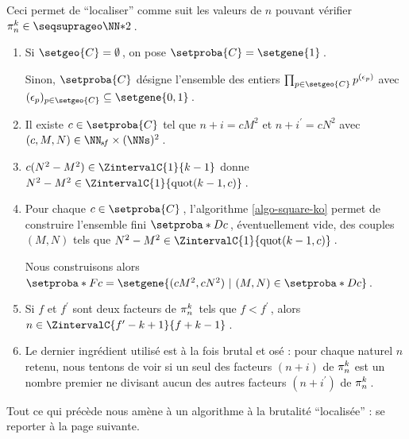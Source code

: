 Ceci permet de \enquote{localiser} comme suit les valeurs de $n$ pouvant vérifier $\consprod \in \NNssquare$\,.
%
\begin{enumerate}
	\item Si $\setgeo{C} = \emptyset$\,, on pose $\setproba{C} = \setgene{1}$\,. 
	
	\noindent
	Sinon, $\setproba{C}$ désigne l'ensemble des entiers $\prod_{p \in \setgeo{C}} p^{(\epsilon_p)}$ avec $(\epsilon_p)_{p \in \setgeo{C}} \subseteq \setgene{0, 1}$\,.


	\item Il existe $c \in \setproba{C}$ tel que $n+i = c M^2$ et $n+i^\prime = c N^2$ avec $(c, M, N) \in \NNsf \times ( \NNs )^2$\,.
	


	\item $c ( N^2 - M^2 ) \in \ZintervalC{1}{k-1}$ donne $N^2 - M^2 \in \ZintervalC{1}{\quot{k-1}{c}}$\,.


	\item Pour chaque $c \in \setproba{C}$\,, l'algorithme \ref{algo-square-ko} permet de construire l'ensemble fini $\setproba*{D}{c}$\,, éventuellement vide, des couples $(M, N)$ tels que $N^2 - M^2 \in \ZintervalC{1}{\quot{k-1}{c}}$\,.
	
	\noindent
	Nous construisons alors
	$\setproba*{F}{c} = \setgene{ (c M^2, c N^2) \,\, | \,\, (M, N) \in \setproba*{D}{c} }$\,.
	


	\item Si $f$ et $f^\prime$ sont deux facteurs de $\consprod$\, tels que $f < f^\prime$\,, alors $n \in \ZintervalC{f^\prime - k + 1}{f + k - 1}$\,.
	


	\item Le dernier ingrédient utilisé est à la fois brutal et osé : pour chaque naturel $n$ retenu, nous tentons de voir si un seul des facteurs $(n+i)$ de $\consprod$ est un nombre premier ne divisant aucun des autres facteurs $(n+i^\prime)$ de $\consprod$\,.
	
\end{enumerate}



Tout ce qui précède nous amène à un algorithme à la brutalité \enquote{localisée} : se reporter à la page suivante.

